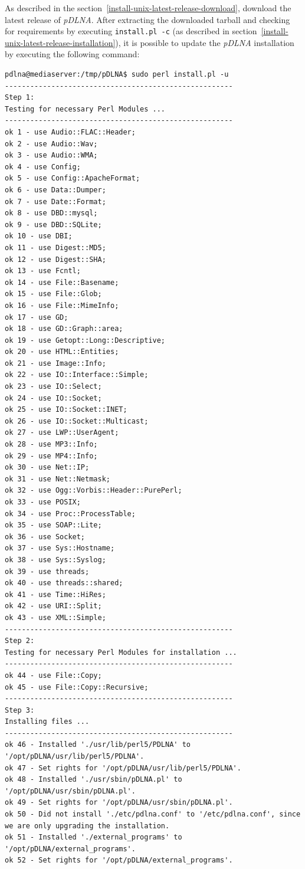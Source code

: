 \documentclass[a4paper,oneside,10pt]{report}
\begin{document}
As described in the section~\ref{install-unix-latest-release-download}, download the latest release of {\em pDLNA}. After extracting the downloaded tarball and checking for requirements by executing \verb|install.pl -c| (as described in section~\ref{install-unix-latest-release-installation}), it is possible to update the {\em pDLNA} installation by executing the following command:
\begin{lstlisting}
pdlna@mediaserver:/tmp/pDLNA$ sudo perl install.pl -u
------------------------------------------------------
Step 1:
Testing for necessary Perl Modules ...
------------------------------------------------------
ok 1 - use Audio::FLAC::Header;
ok 2 - use Audio::Wav;
ok 3 - use Audio::WMA;
ok 4 - use Config;
ok 5 - use Config::ApacheFormat;
ok 6 - use Data::Dumper;
ok 7 - use Date::Format;
ok 8 - use DBD::mysql;
ok 9 - use DBD::SQLite;
ok 10 - use DBI;
ok 11 - use Digest::MD5;
ok 12 - use Digest::SHA;
ok 13 - use Fcntl;
ok 14 - use File::Basename;
ok 15 - use File::Glob;
ok 16 - use File::MimeInfo;
ok 17 - use GD;
ok 18 - use GD::Graph::area;
ok 19 - use Getopt::Long::Descriptive;
ok 20 - use HTML::Entities;
ok 21 - use Image::Info;
ok 22 - use IO::Interface::Simple;
ok 23 - use IO::Select;
ok 24 - use IO::Socket;
ok 25 - use IO::Socket::INET;
ok 26 - use IO::Socket::Multicast;
ok 27 - use LWP::UserAgent;
ok 28 - use MP3::Info;
ok 29 - use MP4::Info;
ok 30 - use Net::IP;
ok 31 - use Net::Netmask;
ok 32 - use Ogg::Vorbis::Header::PurePerl;
ok 33 - use POSIX;
ok 34 - use Proc::ProcessTable;
ok 35 - use SOAP::Lite;
ok 36 - use Socket;
ok 37 - use Sys::Hostname;
ok 38 - use Sys::Syslog;
ok 39 - use threads;
ok 40 - use threads::shared;
ok 41 - use Time::HiRes;
ok 42 - use URI::Split;
ok 43 - use XML::Simple;
------------------------------------------------------
Step 2:
Testing for necessary Perl Modules for installation ...
------------------------------------------------------
ok 44 - use File::Copy;
ok 45 - use File::Copy::Recursive;
------------------------------------------------------
Step 3:
Installing files ...
------------------------------------------------------
ok 46 - Installed './usr/lib/perl5/PDLNA' to '/opt/pDLNA/usr/lib/perl5/PDLNA'.
ok 47 - Set rights for '/opt/pDLNA/usr/lib/perl5/PDLNA'.
ok 48 - Installed './usr/sbin/pDLNA.pl' to '/opt/pDLNA/usr/sbin/pDLNA.pl'.
ok 49 - Set rights for '/opt/pDLNA/usr/sbin/pDLNA.pl'.
ok 50 - Did not install './etc/pdlna.conf' to '/etc/pdlna.conf', since we are only upgrading the installation.
ok 51 - Installed './external_programs' to '/opt/pDLNA/external_programs'.
ok 52 - Set rights for '/opt/pDLNA/external_programs'.

\end{lstlisting}
\end{document}

